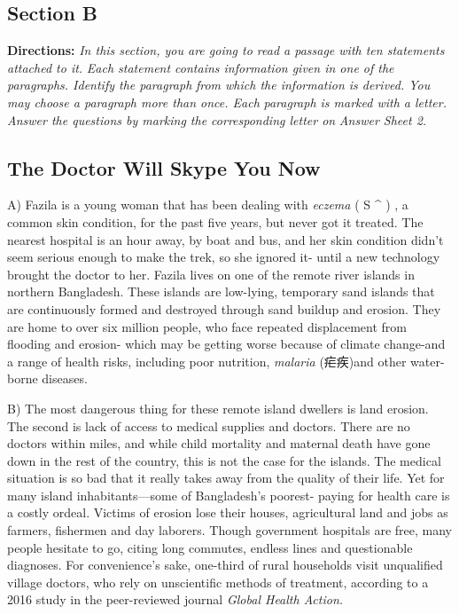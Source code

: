 \documentclass[UTF8,11pt]{ctexart}
\begin{document}
\subsection*{\textbf{Section B}}


\textbf{Directions: }\textit{In this section, you are going to read a passage with ten statements attached to it.} \textit{Each statement contains information given in one of the paragraphs. Identify the paragraph} \textit{from which the information is derived. You may choose a paragraph more than once. Each} \textit{paragraph is marked with a letter. Answer the questions by marking the corresponding letter on} \textit{Answer Sheet 2.}


\subsection*{\textbf{The Doctor Will Skype You Now}}


A) Fazila is a young woman that has been dealing with \textit{eczema} ( S \textasciicircum{} ) , a common skin condition, for the past five years, but never got it treated. The nearest hospital is an hour away, by boat and bus, and her skin condition didn't seem serious enough to make the trek, so she ignored it- until a new technology brought the doctor to her. Fazila lives on one of the remote river islands in northern Bangladesh. These islands are low-lying, temporary sand islands that are continuously formed and destroyed through sand buildup and erosion. They are home to over six million people, who face repeated displacement from flooding and erosion- which may be getting worse because of climate change-and a range of health risks, including poor nutrition, \textit{malaria} (疟疾)and other water-borne diseases.


B) The most dangerous thing for these remote island dwellers is land erosion. The second is lack of access to medical supplies and doctors. There are no doctors within miles, and while child mortality and maternal death have gone down in the rest of the country, this is not the case for the islands. The medical situation is so bad that it really takes away from the quality of their life. Yet for many island inhabitants—some of Bangladesh's poorest- paying for health care is a costly ordeal. Victims of erosion lose their houses, agricultural land and jobs as farmers, fishermen and day laborers. Though government hospitals are free, many people hesitate to go, citing long commutes, endless lines and questionable diagnoses. For convenience's sake, one-third of rural households visit unqualified village doctors, who rely on unscientific methods of treatment, according to a 2016 study in the peer-reviewed journal \textit{Global Health Action.}
\end{document}
